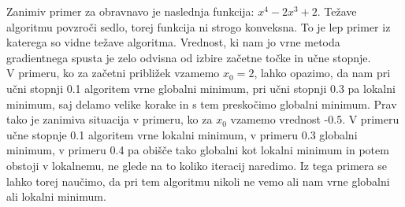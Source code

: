 \documentclass{article}
\begin{document}
\newpage
\noindent Zanimiv primer za obravnavo je naslednja funkcija: $x^4-2x^3+2$. Težave algoritmu povzroči sedlo, torej funkcija ni strogo konveksna. To je lep primer iz katerega so vidne težave algoritma. Vrednost, ki nam jo vrne metoda gradientnega spusta je zelo odvisna od izbire začetne točke in učne stopnje. \\

\noindent V primeru, ko za začetni približek vzamemo $x_0 = 2$, lahko opazimo, da nam pri učni stopnji 0.1 algoritem vrne globalni minimum, pri učni stopnji 0.3 pa lokalni minimum, saj delamo velike korake in s tem preskočimo globalni minimum. Prav tako je zanimiva situacija v primeru, ko za $x_0$ vzamemo vrednost -0.5. V primeru učne stopnje 0.1 algoritem vrne lokalni minimum, v primeru 0.3 globalni minimum, v primeru 0.4 pa obišče tako globalni kot lokalni minimum in potem obstoji v lokalnemu, ne glede na to koliko iteracij naredimo. Iz tega primera se lahko torej naučimo, da pri tem algoritmu nikoli ne vemo ali nam vrne globalni ali lokalni minimum.

\begin{figure}[!htb]
    \centering
\end{figure}
\end{document}

